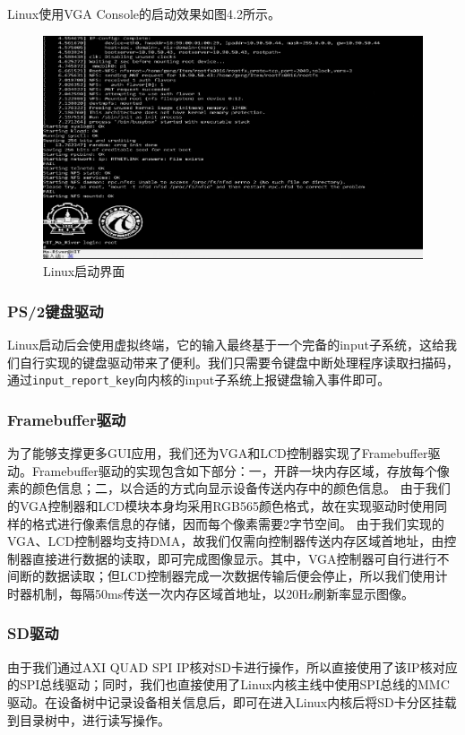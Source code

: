 Linux使用VGA Console的启动效果如图4.2所示。

\begin{figure}[htb] %
\centering %
\includegraphics[width=13cm]{img/linux.png}
\caption{Linux启动界面} %
\label{pic3} %
\end{figure}

\subsubsection{PS/2键盘驱动}
Linux启动后会使用虚拟终端，它的输入最终基于一个完备的input子系统，这给我们自行实现的键盘驱动带来了便利。我们只需要令键盘中断处理程序读取扫描码，通过\texttt{input\_report\_key}向内核的input子系统上报键盘输入事件即可。

\subsubsection{Framebuffer驱动}
为了能够支撑更多GUI应用，我们还为VGA和LCD控制器实现了Framebuffer驱动。Framebuffer驱动的实现包含如下部分：一，开辟一块内存区域，存放每个像素的颜色信息；二，以合适的方式向显示设备传送内存中的颜色信息。
由于我们的VGA控制器和LCD模块本身均采用RGB565颜色格式，故在实现驱动时使用同样的格式进行像素信息的存储，因而每个像素需要2字节空间。
由于我们实现的VGA、LCD控制器均支持DMA，故我们仅需向控制器传送内存区域首地址，由控制器直接进行数据的读取，即可完成图像显示。其中，VGA控制器可自行进行不间断的数据读取；但LCD控制器完成一次数据传输后便会停止，所以我们使用计时器机制，每隔50ms传送一次内存区域首地址，以20Hz刷新率显示图像。

\subsubsection{SD驱动}
由于我们通过AXI QUAD SPI IP核对SD卡进行操作，所以直接使用了该IP核对应的SPI总线驱动；同时，我们也直接使用了Linux内核主线中使用SPI总线的MMC驱动。在设备树中记录设备相关信息后，即可在进入Linux内核后将SD卡分区挂载到目录树中，进行读写操作。

